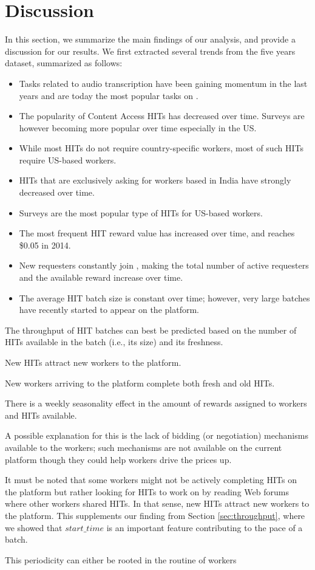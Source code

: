 \section{Discussion}
\label{sec:discuss}

In this section, we summarize the main findings of our analysis, and provide a discussion for our results. We first extracted several trends from the five years dataset, summarized as follows:
\begin{itemize}[noitemsep,topsep=0pt,parsep=0pt,partopsep=0pt]
	\item Tasks related to audio transcription have been gaining momentum in the last years and are today the most popular tasks on \amt{}.
	\item The popularity of Content Access HITs has decreased over time. Surveys are however becoming more popular over time especially in the US.
	\item While most HITs do not require country-specific workers, most of such HITs require US-based workers.
	\item HITs that are exclusively asking for workers based in India have strongly decreased over time.
	\item Surveys are the most popular type of HITs for US-based workers.
	\item The most frequent HIT reward value has increased over time, and reaches \$0.05 in 2014.
	\item New requesters constantly join \amt{}, making the total number of active requesters and the available reward increase over time.
	\item The average HIT batch size is constant over time; however, very large batches have recently started to appear on the platform.
\end{itemize}

The throughput of HIT batches can best be predicted based on the number of HITs available in the batch (i.e., its size) and its freshness.

New HITs attract new workers to the platform.

New workers arriving to the platform complete both fresh and old HITs.

There is a weekly seasonality effect in the amount of rewards assigned to workers and HITs available.



A possible explanation for this is the lack of bidding (or negotiation) mechanisms available to the workers; such mechanisms are not available on the current platform though they could help workers drive the prices up. 

It must be noted that some workers might not be actively completing HITs on the platform but rather looking for HITs to work on by reading Web forums where other workers shared HITs. In that sense, new HITs attract new workers to the platform. This supplements our finding from Section \ref{sec:throughput}, where we showed that $start\_time$ is an important feature contributing to the pace of a batch.


This periodicity can either be rooted in the routine of workers